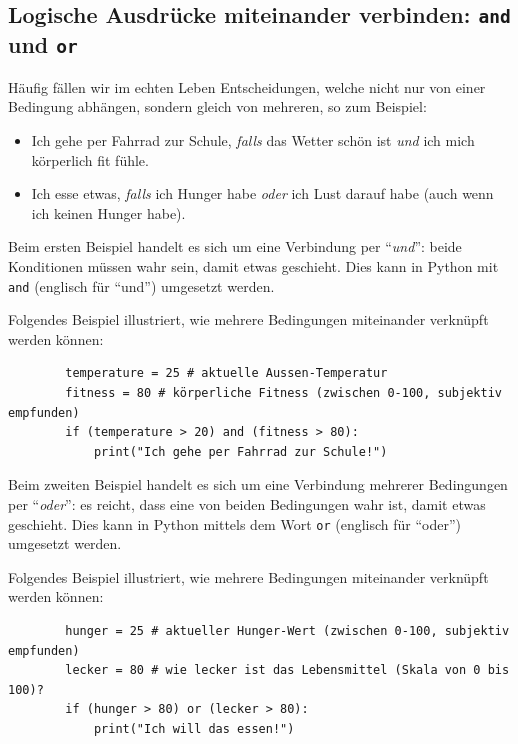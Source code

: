 \subsection{Logische Ausdrücke miteinander verbinden: \texorpdfstring{\lstinline|and|}{and} und \texorpdfstring{\lstinline|or|}{or}}



Häufig fällen wir im echten Leben Entscheidungen, welche nicht nur von einer Bedingung abhängen, sondern gleich von mehreren, so zum Beispiel:
\begin{itemize}
	\item Ich gehe per Fahrrad zur Schule, \textit{falls} das Wetter schön ist \textit{und} ich mich körperlich fit fühle.
	\item Ich esse etwas, \textit{falls} ich Hunger habe \textit{oder} ich Lust darauf habe (auch wenn ich keinen Hunger habe).
\end{itemize}
Beim ersten Beispiel handelt es sich um eine Verbindung per \enquote{\textit{und}}: beide Konditionen müssen wahr sein, damit etwas geschieht. Dies kann in Python mit \lstinline|and| (englisch für \enquote{und}) umgesetzt werden.

\begin{myexample}\label{example:fahrrad}
Folgendes Beispiel illustriert, wie mehrere Bedingungen miteinander verknüpft werden können:
\begin{lstlisting}
		temperature = 25 # aktuelle Aussen-Temperatur
		fitness = 80 # körperliche Fitness (zwischen 0-100, subjektiv empfunden)
		if (temperature > 20) and (fitness > 80):
			print("Ich gehe per Fahrrad zur Schule!")
	\end{lstlisting}
\end{myexample}

Beim zweiten Beispiel handelt es sich um eine Verbindung mehrerer Bedingungen per \enquote{\textit{oder}}: es reicht, dass eine von beiden Bedingungen wahr ist, damit etwas geschieht. Dies kann in Python mittels dem Wort \lstinline|or| (englisch für \enquote{oder}) umgesetzt werden.
\begin{myexample}
Folgendes Beispiel illustriert, wie mehrere Bedingungen miteinander verknüpft werden können:
\begin{lstlisting}
		hunger = 25 # aktueller Hunger-Wert (zwischen 0-100, subjektiv empfunden)
		lecker = 80 # wie lecker ist das Lebensmittel (Skala von 0 bis 100)?
		if (hunger > 80) or (lecker > 80):
			print("Ich will das essen!")
	\end{lstlisting}
\end{myexample}

